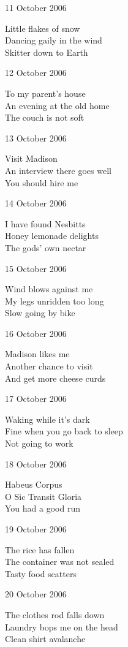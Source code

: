\documentclass[12pt]{article}
\begin{document}
11 October 2006

Little flakes of snow \\
Dancing gaily in the wind \\
Skitter down to Earth

12 October 2006

To my parent's house \\
An evening at the old home \\
The couch is not soft

13 October 2006

Visit Madison \\
An interview there goes well \\
You should hire me


\newpage

14 October 2006

I have found Nesbitts \\
Honey lemonade delights \\
The gods' own nectar

15 October 2006

Wind blows against me \\
My legs unridden too long \\
Slow going by bike

16 October 2006

Madison likes me \\
Another chance to visit \\
And get more cheese curds

17 October 2006

Waking while it's dark \\
Fine when you go back to sleep \\
Not going to work

18 October 2006

Habeus Corpus \\
O Sic Transit Gloria \\
You had a good run

19 October 2006

The rice has fallen \\
The container was not sealed \\
Tasty food scatters


\newpage


20 October 2006

The clothes rod falls down \\
Laundry bops me on the head \\
Clean shirt avalanche
\end{document}
